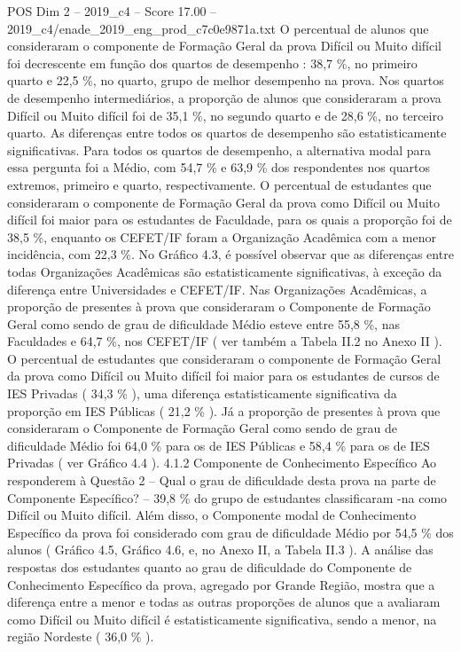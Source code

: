 \begin{textsample}{POS Dim 2 – 2019\_c4 – Score 17.00 – 2019\_c4/enade\_2019\_eng\_prod\_c7c0e9871a.txt}
O percentual de alunos que consideraram o componente de Formação Geral da prova Difícil ou Muito difícil foi decrescente em função dos quartos de desempenho : 38,7 \%, no primeiro quarto e 22,5 \%, no quarto, grupo de melhor desempenho na prova.
Nos quartos de desempenho intermediários, a proporção de alunos que consideraram a prova Difícil ou Muito difícil foi de 35,1 \%, no segundo quarto e de 28,6 \%, no terceiro quarto.
As diferenças entre todos os quartos de desempenho são estatisticamente significativas.
Para todos os quartos de desempenho, a alternativa modal para essa pergunta foi a Médio, com 54,7 \% e 63,9 \% dos respondentes nos quartos extremos, primeiro e quarto, respectivamente.
O percentual de estudantes que consideraram o componente de Formação Geral da prova como Difícil ou Muito difícil foi maior para os estudantes de Faculdade, para os quais a proporção foi de 38,5 \%, enquanto os CEFET/IF foram a Organização Acadêmica com a menor incidência, com 22,3 \%.
No Gráfico 4.3, é possível observar que as diferenças entre todas Organizações Acadêmicas são estatisticamente significativas, à exceção da diferença entre Universidades e CEFET/IF.
Nas Organizações Acadêmicas, a proporção de presentes à prova que consideraram o Componente de Formação Geral como sendo de grau de dificuldade Médio esteve entre 55,8 \%, nas Faculdades e 64,7 \%, nos CEFET/IF ( ver também a Tabela II.2 no Anexo II ).
O percentual de estudantes que consideraram o componente de Formação Geral da prova como Difícil ou Muito difícil foi maior para os estudantes de cursos de IES Privadas ( 34,3 \% ), uma diferença estatisticamente significativa da proporção em IES Públicas ( 21,2 \% ).
Já a proporção de presentes à prova que consideraram o Componente de Formação Geral como sendo de grau de dificuldade Médio foi 64,0 \% para os de IES Públicas e 58,4 \% para os de IES Privadas ( ver Gráfico 4.4 ). 4.1.2 Componente de Conhecimento Específico Ao responderem à Questão 2 – Qual o grau de dificuldade desta prova na parte de Componente Específico? – 39,8 \% do grupo de estudantes classificaram -na como Difícil ou Muito difícil.
Além disso, o Componente modal de Conhecimento Específico da prova foi considerado com grau de dificuldade Médio por 54,5 \% dos alunos ( Gráfico 4.5, Gráfico 4.6, e, no Anexo II, a Tabela II.3 ).
A análise das respostas dos estudantes quanto ao grau de dificuldade do Componente de Conhecimento Específico da prova, agregado por Grande Região, mostra que a diferença entre a menor e todas as outras proporções de alunos que a avaliaram como Difícil ou Muito difícil é estatisticamente significativa, sendo a menor, na região Nordeste ( 36,0 \% ).

\end{textsample}
